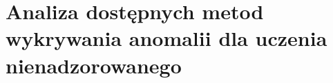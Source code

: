 \chapter{Analiza dostępnych metod wykrywania anomalii dla uczenia nienadzorowanego}
\label{chap::przeglad}